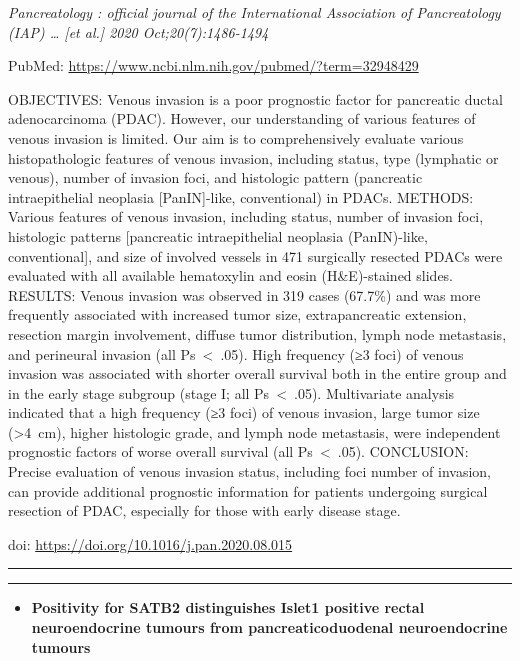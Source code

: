 \documentclass[
]{article}
\providecommand{\tightlist}{%
  \setlength{\itemsep}{0pt}\setlength{\parskip}{0pt}}
\begin{document}
\emph{Pancreatology : official journal of the International Association
of Pancreatology (IAP) \ldots{} {[}et al.{]} 2020 Oct;20(7):1486-1494}

PubMed: \url{https://www.ncbi.nlm.nih.gov/pubmed/?term=32948429}

OBJECTIVES: Venous invasion is a poor prognostic factor for pancreatic
ductal adenocarcinoma (PDAC). However, our understanding of various
features of venous invasion is limited. Our aim is to comprehensively
evaluate various histopathologic features of venous invasion, including
status, type (lymphatic or venous), number of invasion foci, and
histologic pattern (pancreatic intraepithelial neoplasia
{[}PanIN{]}-like, conventional) in PDACs. METHODS: Various features of
venous invasion, including status, number of invasion foci, histologic
patterns {[}pancreatic intraepithelial neoplasia (PanIN)-like,
conventional{]}, and size of involved vessels in 471 surgically resected
PDACs were evaluated with all available hematoxylin and eosin
(H\&E)-stained slides. RESULTS: Venous invasion was observed in 319
cases (67.7\%) and was more frequently associated with increased tumor
size, extrapancreatic extension, resection margin involvement, diffuse
tumor distribution, lymph node metastasis, and perineural invasion (all
Ps~\textless~.05). High frequency (≥3 foci) of venous invasion was
associated with shorter overall survival both in the entire group and in
the early stage subgroup (stage I; all Ps~\textless~.05). Multivariate
analysis indicated that a high frequency (≥3 foci) of venous invasion,
large tumor size (\textgreater4~cm), higher histologic grade, and lymph
node metastasis, were independent prognostic factors of worse overall
survival (all Ps~\textless~.05). CONCLUSION: Precise evaluation of
venous invasion status, including foci number of invasion, can provide
additional prognostic information for patients undergoing surgical
resection of PDAC, especially for those with early disease stage.

doi: \url{https://doi.org/10.1016/j.pan.2020.08.015}

\begin{center}\rule{0.5\linewidth}{0.5pt}\end{center}

\begin{center}\rule{0.5\linewidth}{0.5pt}\end{center}

\begin{itemize}
\tightlist
\item
  \textbf{Positivity for SATB2 distinguishes Islet1 positive rectal
  neuroendocrine tumours from pancreaticoduodenal neuroendocrine
  tumours}
\end{itemize}
\end{document}

